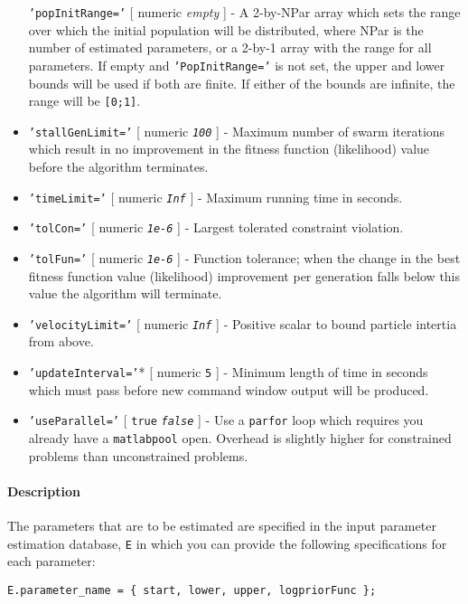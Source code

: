 \begin{itemize}
  \texttt{'popInitRange='} {[} numeric \textbar{} \emph{empty} {]} - A
  2-by-NPar array which sets the range over which the initial population
  will be distributed, where NPar is the number of estimated parameters,
  or a 2-by-1 array with the range for all parameters. If empty and
  \texttt{'PopInitRange='} is not set, the upper and lower bounds will
  be used if both are finite. If either of the bounds are infinite, the
  range will be \texttt{{[}0;1{]}}.
\item
  \texttt{'stallGenLimit='} {[} numeric \textbar{} \emph{\texttt{100}}
  {]} - Maximum number of swarm iterations which result in no
  improvement in the fitness function (likelihood) value before the
  algorithm terminates.
\item
  \texttt{'timeLimit='} {[} numeric \textbar{} \emph{\texttt{Inf}} {]} -
  Maximum running time in seconds.
\item
  \texttt{'tolCon='} {[} numeric \textbar{} \emph{\texttt{1e-6}} {]} -
  Largest tolerated constraint violation.
\item
  \texttt{'tolFun='} {[} numeric \textbar{} \emph{\texttt{1e-6}} {]} -
  Function tolerance; when the change in the best fitness function value
  (likelihood) improvement per generation falls below this value the
  algorithm will terminate.
\item
  \texttt{'velocityLimit='} {[} numeric \textbar{} \emph{\texttt{Inf}}
  {]} - Positive scalar to bound particle intertia from above.
\item
  \texttt{'updateInterval='}* {[} numeric \textbar{} \texttt{5} {]} -
  Minimum length of time in seconds which must pass before new command
  window output will be produced.
\item
  \texttt{'useParallel='} {[} \texttt{true} \textbar{}
  \emph{\texttt{false}} {]} - Use a \texttt{parfor} loop which requires
  you already have a \texttt{matlabpool} open. Overhead is slightly
  higher for constrained problems than unconstrained problems.
\end{itemize}

\paragraph{Description}

The parameters that are to be estimated are specified in the input
parameter estimation database, \texttt{E} in which you can provide the
following specifications for each parameter:

\begin{verbatim}
E.parameter_name = { start, lower, upper, logpriorFunc };
\end{verbatim}

